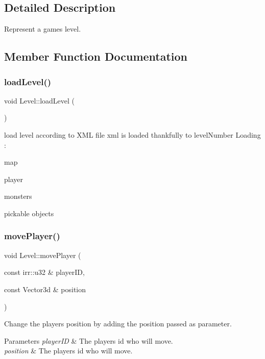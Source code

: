 \subsection{Detailed Description}
Represent a game\textquotesingle{}s level. 

\subsection{Member Function Documentation}
\mbox{\label{classLevel_aa88db36cd824320cb599d913603dc2a3}} 
\subsubsection{\texorpdfstring{load\+Level()}{loadLevel()}}
{\footnotesize\ttfamily void Level\+::load\+Level (\begin{DoxyParamCaption}{ }\end{DoxyParamCaption})}

load level according to X\+ML file xml is loaded thankfully to level\+Number Loading \+:
\begin{DoxyItemize}
\item map
\item player
\item monsters
\item pickable objects 
\end{DoxyItemize}\mbox{\label{classLevel_ac679a141274c19107c288fe40b967e95}} 
\subsubsection{\texorpdfstring{move\+Player()}{movePlayer()}}
{\footnotesize\ttfamily void Level\+::move\+Player (\begin{DoxyParamCaption}\item[{const irr\+::u32 \&}]{player\+ID,  }\item[{const Vector3d \&}]{position }\end{DoxyParamCaption})}



Change the player\textquotesingle{}s position by adding the position passed as parameter. 


\begin{DoxyParams}{Parameters}
{\em player\+ID} & The player\textquotesingle{}s id who will move. \\
\hline
{\em position} & The player\textquotesingle{}s id who will move. \\
\hline
\end{DoxyParams}
\mbox{\label{classLevel_ab8311fe64b7957d627053359331b0b6b}} 
